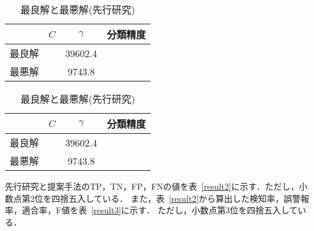 \begin{table}[tb]
  \begin{minipage}{0.45\textwidth}  %
      \centering
      \caption{最良解と最悪解(提案手法)}  %
      \begin{tabular}{|c|c|c|c|}  %
          \hline  %
          &$C$ &$\gamma$ &分類精度 \\  %
          \hline  %
        最良解& & 39602.4& \\  %
          \hline  %
        最悪解 & &9743.8 &\\  %
          \hline  %
      \end{tabular}
      \label{myparam1}  %
  \end{minipage} \hspace{1cm}  %
  \begin{minipage}{0.45\textwidth}  %
      \centering
      \caption{最良解と最悪解(先行研究)}  %
      \begin{tabular}{|c|c|c|c|}  %
          \hline  %
          &$C$ &$\gamma$ &分類精度 \\  %
          \hline  %
        最良解 && 39602.4& \\  %
          \hline  %
        最悪解  &&9743.8 &\\  %
          \hline  %
      \end{tabular}
      \label{myparam2}  %
  \end{minipage}
\end{table}



  先行研究と提案手法のTP，TN，FP，FNの値を表~\ref{result2}に示す．ただし，小数点第2位を四捨五入している．
また，表~\ref{result2}から算出した検知率，誤警報率，適合率，F値を表~\ref{result3}に示す．
ただし，小数点第3位を四捨五入している．

